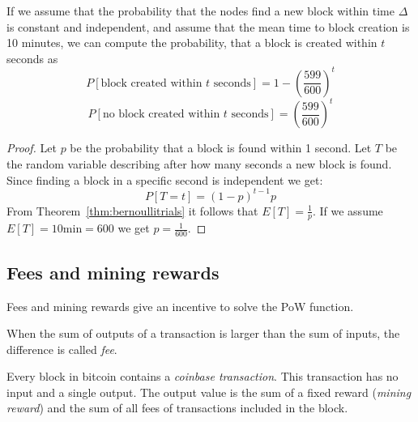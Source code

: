 \begin{lem}
	If we assume that the probability that the nodes find a new block within time $\Delta$ is constant and independent, and assume that the mean time to block creation is 10 minutes, we can compute the probability, that a block is created within $t$ seconds as
	\[
		P[\text{block created within } t \text{ seconds}] = 1- \left(\frac{599}{600} \right)^t
	\]
	\[
		P[\text{no block created within } t \text{ seconds}] = \left(\frac{599}{600} \right)^t
	\]
\end{lem}
\begin{proof}
Let $p$ be the probability that a block is found within 1 second.
Let $T$ be the random variable describing after how many seconds a new block is found. Since finding a block in a specific second is independent we get:
\[
P[T=t] = (1-p)^{t-1}p
\]
From Theorem~\ref{thm:bernoullitrials} it follows that $E[T] = \frac{1}{p}$.
If we assume $E[T]= 10 \text{min} = 600$ we get $p=\frac{1}{600}$.
\end{proof}


\subsection{Fees and mining rewards}
Fees and mining rewards give an incentive to solve the PoW function.

\begin{definition}
When the sum of outputs of a transaction is larger than the sum of inputs, the difference is called \emph{fee}.	
\end{definition}

\begin{definition}
 Every block in bitcoin contains a \emph{coinbase transaction}. This transaction has no input and a single output. The output value is the sum of a fixed reward (\emph{mining reward}) and the sum of all fees of transactions included in the block.
\end{definition}

